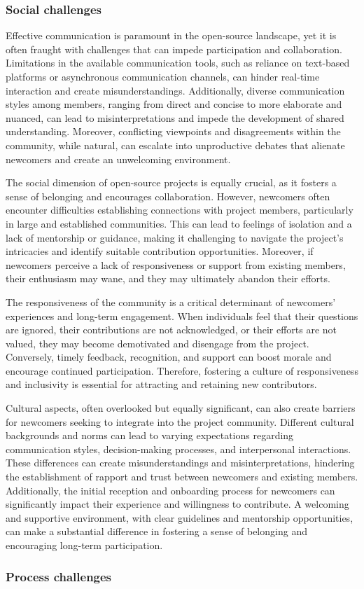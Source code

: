 \subsubsection{Social challenges}

Effective communication is paramount in the open-source landscape, yet it is often fraught with challenges that can impede participation and collaboration. Limitations in the available communication tools, such as reliance on text-based platforms or asynchronous communication channels, can hinder real-time interaction and create misunderstandings. Additionally, diverse communication styles among members, ranging from direct and concise to more elaborate and nuanced, can lead to misinterpretations and impede the development of shared understanding. Moreover, conflicting viewpoints and disagreements within the community, while natural, can escalate into unproductive debates that alienate newcomers and create an unwelcoming environment.

The social dimension of open-source projects is equally crucial, as it fosters a sense of belonging and encourages collaboration. However, newcomers often encounter difficulties establishing connections with project members, particularly in large and established communities. This can lead to feelings of isolation and a lack of mentorship or guidance, making it challenging to navigate the project's intricacies and identify suitable contribution opportunities. Moreover, if newcomers perceive a lack of responsiveness or support from existing members, their enthusiasm may wane, and they may ultimately abandon their efforts.

The responsiveness of the community is a critical determinant of newcomers' experiences and long-term engagement. When individuals feel that their questions are ignored, their contributions are not acknowledged, or their efforts are not valued, they may become demotivated and disengage from the project. Conversely, timely feedback, recognition, and support can boost morale and encourage continued participation. Therefore, fostering a culture of responsiveness and inclusivity is essential for attracting and retaining new contributors.

Cultural aspects, often overlooked but equally significant, can also create barriers for newcomers seeking to integrate into the project community. Different cultural backgrounds and norms can lead to varying expectations regarding communication styles, decision-making processes, and interpersonal interactions. These differences can create misunderstandings and misinterpretations, hindering the establishment of rapport and trust between newcomers and existing members. Additionally, the initial reception and onboarding process for newcomers can significantly impact their experience and willingness to contribute. A welcoming and supportive environment, with clear guidelines and mentorship opportunities, can make a substantial difference in fostering a sense of belonging and encouraging long-term participation.


\subsubsection{Process challenges}





\clearpage